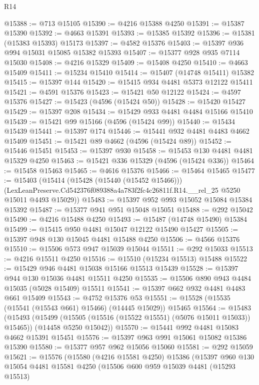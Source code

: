 \begin{lexlean}{R14}
\begin{coremodule}
@15388 := @713 @15105
@15390 := @4216 @15388 @4250
@15391 := @15387 @15390
@15392 := @4663 @15391
@15393 := @15385 @15392
@15396 := @15381 (@15383 @15393) @15173
@15397 := @4582 @15376
@15403 := @15397 @936 @994 @15031 @15085 @15382 @15393
@15407 := @15377 @928 @935 @7114 @15030
@15408 := @4216 @15329
@15409 := @15408 @4250
@15410 := @4663 @15409
@15411 := @15234 @15410
@15414 := @15407 (@14748 @15411) @15382
@15415 := @15397 @144
@15420 := @15415 @934 @4481 @5373 @12122 @15411
@15421 := @4591 @15376
@15423 := @15421 @50 @12122
@15424 := @4597 @15376
@15427 := @15423 (@4596 (@15424 @50))
@15428 := @15420 @15427
@15429 := @15397 @208
@15434 := @15429 @933 @4481 @4484 @15166 @15410
@15439 := @15421 @99 @15166 (@4596 (@15424 @99))
@15440 := @15434 @15439
@15441 := @15397 @174
@15446 := @15441 @932 @4481 @4483 @4662 @15409
@15451 := @15421 @89 @4662 (@4596 (@15424 @89))
@15452 := @15446 @15451
@15453 := @15397 @930
@15458 := @15453 @130 @4481 @4481 @15329 @4250
@15463 := @15421 @336 @15329 (@4596 (@15424 @336))
@15464 := @15458 @15463
@15465 := @4616 @15376
@15466 := @15464 @15465
@15477 := @15403
    (@15414
      (@15428 (@15440 (@15452 @15466)))
      (LexLeanPreserve.Cd542376f089388a4a783f2fc4c26811f.R14.__rel_25 @5250 @15011 @4493 @15029))
@15483 := @15397 @952 @993 @15052 @15084 @15384 @15392
@15487 := @15377 @941 @951 @15048 @15051
@15488 := @292 @15042
@15490 := @4216 @15488 @4250
@15493 := @15487 (@14748 @15490) @15384
@15499 := @15415 @950 @4481 @15047 @12122 @15490 @15427
@15505 := @15397 @948 @130 @15045 @4481 @15488 @4250
@15506 := @4566 @15376
@15510 := @15506 @573 @947 @15039 @15044
@15511 := @292 @15033
@15513 := @4216 @15511 @4250
@15516 := @15510 (@15234 @15513) @15488
@15522 := @15429 @946 @4481 @15038 @15166 @15513 @15439
@15528 := @15397 @944 @130 @15036 @4481 @15511 @4250
@15535 := @15506 @890 @943 @4484 @15035 (@5028 @15409) @15511
@15541 := @15397 @662 @932 @4481 @4483 @661 @15409
@15543 := @4752 @15376 @53
@15551 := @15528 (@15535 (@15541 (@15543 @661) @15466) (@14445 @15029)) @15465
@15564 := @15483
    (@15493
      (@15499 (@15505 (@15516 (@15522 @15551) (@5076 @15011 @15033)) @15465))
      (@14458 @5250 @15042))
@15570 := @15441 @992 @4481 @15083 @4662 @15391 @15451
@15576 := @15397 @963 @991 @15061 @15082 @15386 @15390
@15580 := @15377 @957 @962 @15056 @15060
@15581 := @292 @15059
@15621 := @15576
    (@15580
      (@4216 @15581 @4250)
      @15386
      (@15397
        @960
        @130
        @15054
        @4481
        @15581
        @4250
        (@15506
          @600
          @959
          @15039
          @4481
          (@15293 @15513)

\end{coremodule}
\end{lexlean}
